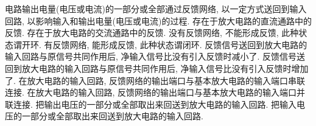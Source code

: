 \documentclass[hidelinks]{ctexart}
\begin{document}
 电路输出电量(电压或电流)的一部分或全部通过反馈网络, 以一定方式送回到输入回路, 以影响输入和输出电量(电压或电流)的过程.
 存在于放大电路的直流通路中的反馈.
 存在于放大电路的交流通路中的反馈.
 没有反馈网络, 不能形成反馈, 此种状态谓开环.
 有反馈网络, 能形成反馈, 此种状态谓闭环.
 反馈信号送回到放大电路的输入回路与原信号共同作用后, 净输入信号比没有引入反馈时减小了.
 反馈信号送回到放大电路的输入回路与原信号共同作用后, 净输入信号比没有引入反馈时增加了.
 在放大电路的输入回路, 反馈网络的输出端口与基本放大电路的输入端口串联连接.
 在放大电路的输入回路, 反馈网络的输出端口与基本放大电路的输入端口并联连接.
 把输出电压的一部分或全部取出来回送到放大电路的输入回路.
 把输入电压的一部分或全部取出来回送到放大电路的输入回路.

\end{document}
